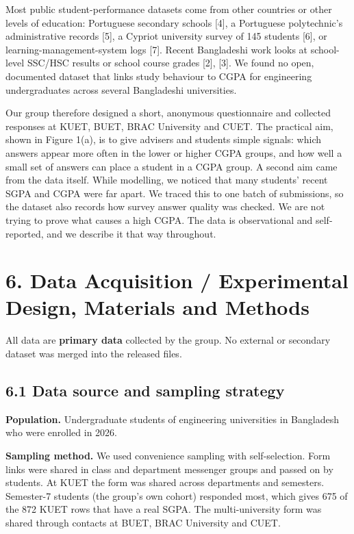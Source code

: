 \documentclass[11pt,a4paper]{article}
\begin{document}
Most public student-performance datasets come from other countries or other levels of education: Portuguese secondary schools [4], a Portuguese polytechnic's administrative records [5], a Cypriot university survey of 145 students [6], or learning-management-system logs [7]. Recent Bangladeshi work looks at school-level SSC/HSC results or school course grades [2], [3]. We found no open, documented dataset that links study behaviour to CGPA for engineering undergraduates across several Bangladeshi universities.

Our group therefore designed a short, anonymous questionnaire and collected responses at KUET, BUET, BRAC University and CUET. The practical aim, shown in Figure 1(a), is to give advisers and students simple signals: which answers appear more often in the lower or higher CGPA groups, and how well a small set of answers can place a student in a CGPA group. A second aim came from the data itself. While modelling, we noticed that many students' recent SGPA and CGPA were far apart. We traced this to one batch of submissions, so the dataset also records how survey answer quality was checked. We are not trying to prove what causes a high CGPA. The data is observational and self-reported, and we describe it that way throughout.

\section{6. Data Acquisition / Experimental Design, Materials and Methods}
All data are \textbf{primary data} collected by the group. No external or secondary dataset was merged into the released files.

\subsection{6.1 Data source and sampling strategy}
\textbf{Population.} Undergraduate students of engineering universities in Bangladesh who were enrolled in 2026.

\textbf{Sampling method.} We used convenience sampling with self-selection. Form links were shared in class and department messenger groups and passed on by students. At KUET the form was shared across departments and semesters. Semester-7 students (the group's own cohort) responded most, which gives 675 of the 872 KUET rows that have a real SGPA. The multi-university form was shared through contacts at BUET, BRAC University and CUET.
\end{document}
